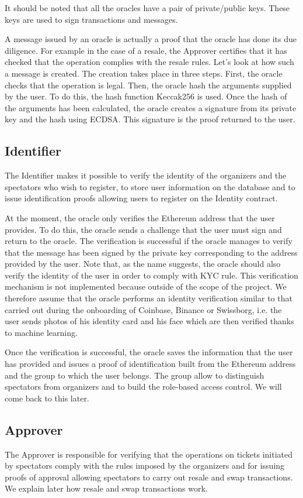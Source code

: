 \documentclass[a4paper,11pt,oneside]{report}
\begin{document}
It should be noted that all the oracles have a pair of private/public keys. These keys are used to sign transactions and messages.

A message issued by an oracle is actually a proof that the oracle has done its due diligence. For example in the case of a resale, the Approver certifies that it has checked that the operation complies with the resale rules. Let's look at how such a message is created. The creation takes place in three steps. First, the oracle checks that the operation is legal. Then, the oracle hash the arguments supplied by the user. To do this, the hash function Keccak256 is used. Once the hash of the arguments has been calculated, the oracle creates a signature from its private key and the hash using ECDSA. This signature is the proof returned to the user.

\subsection{Identifier}
The Identifier makes it possible to verify the identity of the organizers and the spectators who wish to register, to store user information on the database and to issue identification proofs allowing users to register on the Identity contract.

At the moment, the oracle only verifies the Ethereum address that the user provides. To do this, the oracle sends a challenge that the user must sign and return to the oracle. The verification is successful if the oracle manages to verify that the message has been signed by the private key corresponding to the address provided by the user. Note that, as the name suggests, the oracle should also verify the identity of the user in order to comply with KYC rule. This verification mechanism is not implemented because outside of the scope of the project. We therefore assume that the oracle performs an identity verification similar to that carried out during the onboarding of Coinbase, Binance or Swissborg, i.e. the user sends photos of his identity card and his face which are then verified thanks to machine learning.

Once the verification is successful, the oracle saves the information that the user has provided and issues a proof of identification built from the Ethereum address and the group to which the user belongs. The group allow to distinguish spectators from organizers and to build the role-based access control. We will come back to this later.

\subsection{Approver}
The Approver is responsible for verifying that the operations on tickets initiated by spectators comply with the rules imposed by the organizers and for issuing proofs of approval allowing spectators to carry out resale and swap transactions. We explain later how resale and swap transactions work.
\end{document}
